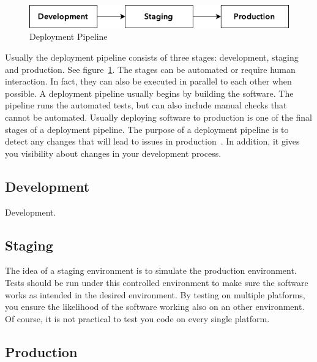 \documentclass[english]{tktltiki2}
\begin{document}
\begin{figure}[h!]

    \vspace{1cm}
    \centering

    \includegraphics{figures/deployment-pipeline}

    \caption{Deployment Pipeline}
    \label{figure:deployment-pipeline}

    \vspace{1cm}

\end{figure}

Usually the deployment pipeline consists of three stages: development, staging and production. See figure~\ref{figure:deployment-pipeline}. The stages can be automated or require human interaction. In fact, they can also be executed in parallel to each other when possible. A deployment pipeline usually begins by building the software. The pipeline runs the automated tests, but can also include manual checks that cannot be automated. Usually deploying software to production is one of the final stages of a deployment pipeline. The purpose of a deployment pipeline is to detect any changes that will lead to issues in production~\cite{Fow13b}. In addition, it gives you visibility about changes in your development process.

\subsection{Development}

Development.

\subsection{Staging}

The idea of a staging environment is to simulate the production environment. Tests should be run under this controlled environment to make sure the software works as intended in the desired environment. By testing on multiple platforms, you ensure the likelihood of the software working also on an other environment. Of course, it is not practical to test you code on every single platform.

\subsection{Production}
\end{document}
